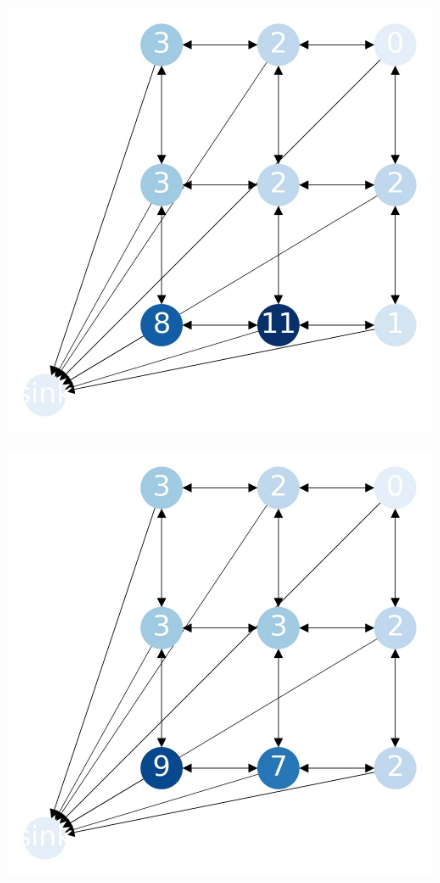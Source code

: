 \documentclass{beamer}
\begin{document}
    \begin{frame}
      \begin{figure}[h!]
        \centering
          \includegraphics[scale=0.25]{sandpile_-18}
      \end{figure}
    \end{frame}
    

    \begin{frame}
      \begin{figure}[h!]
        \centering
          \includegraphics[scale=0.25]{sandpile_-19}
      \end{figure}
    \end{frame}
    
\end{document}
